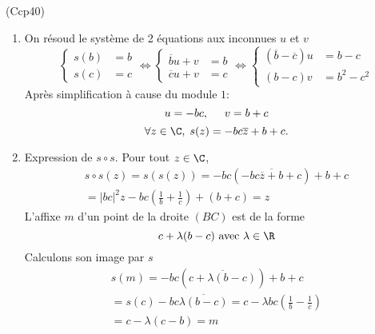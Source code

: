 \begin{tiny}(Ccp40)\end{tiny}
\begin{enumerate}
 \item On résoud le système de 2 équations aux inconnues $u$ et $v$
\begin{displaymath}
\left\lbrace 
\begin{aligned}
 s(b) &= b \\ s(c) &= c
\end{aligned}
\right. 
\Leftrightarrow
\left\lbrace 
\begin{aligned}
 \overline{b}u + v &= b \\ \overline{c}u + v &= c
\end{aligned}
\right. 
\Leftrightarrow
\left\lbrace 
\begin{aligned}
 (\overline{b}-\overline{c})u &= b-c \\ (b-c)v &=b^2- c^2
\end{aligned}
\right. 
\end{displaymath}
Après simplification à cause du module $1$:
\begin{displaymath}
 u = -bc,\hspace{0.5cm} v =b+c
\end{displaymath}
\begin{displaymath}
 \forall z\in \C,\;s(z) = -bc\overline{z} + b+c.
\end{displaymath}

 \item Expression de $s\circ s$. Pour tout $z\in \C$,
\begin{multline*}
s\circ s(z) = s(s(z)) 
= -bc(\overline{-bc\overline{z}+b+c}) +b+c \\
= |bc|^2z -bc(\frac{1}{b}+\frac{1}{c}) + (b+c) = z
\end{multline*}
L'affixe $m$ d'un point de la droite $(BC)$ est de la forme
\begin{displaymath}
 c + \lambda(b-c) \text{ avec } \lambda\in \R
\end{displaymath}
Calculons son image par $s$
\begin{multline*}
 s(m) = -bc (\overline{c + \lambda(b-c)}) + b+c \\
 = s(c) -bc\overline{\lambda(b-c)}
 = c -\lambda bc(\frac{1}{b}-\frac{1}{c})\\
 = c -\lambda(c-b) = m
\end{multline*}
\end{enumerate}
